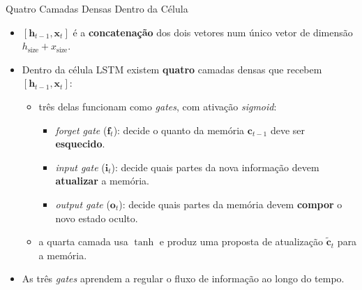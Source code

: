 \documentclass[aspectratio=169,xcolor=dvipsnames]{beamer}
\begin{document}
\begin{frame}{Quatro Camadas Densas Dentro da Célula}
\begin{itemize}
    \item $[\mathbf{h}_{t-1}, \mathbf{x}_t]$ é a \textbf{concatenação} dos dois vetores num único vetor de dimensão $h_{\text{size}} + x_{\text{size}}$.
    \item Dentro da célula LSTM existem \textbf{quatro} camadas densas que recebem $[\mathbf{h}_{t-1}, \mathbf{x}_t]$:
    \begin{itemize}
        \item três delas funcionam como \textit{gates}, com ativação \textit{sigmoid}:
        \begin{itemize}
            \item \textit{forget gate} ($\mathbf{f}_t$): decide o quanto da memória $\mathbf{c}_{t-1}$ deve ser \textbf{esquecido}.
            \item \textit{input gate} ($\mathbf{i}_t$): decide quais partes da nova informação devem \textbf{atualizar} a memória.
            \item \textit{output gate} ($\mathbf{o}_t$): decide quais partes da memória devem \textbf{compor} o novo estado oculto.
        \end{itemize}
        \item a quarta camada usa $\tanh$ e produz uma proposta de atualização $\tilde{\mathbf{c}}_t$ para a memória.
    \end{itemize}
    \item As três \textit{gates} aprendem a regular o fluxo de informação ao longo do tempo.
\end{itemize}
\end{frame}
\end{document}

